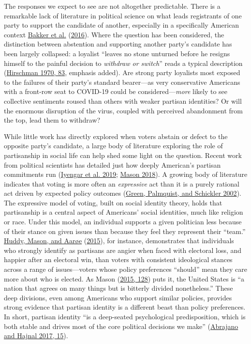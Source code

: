 \documentclass[
  12pt,
]{article}
\begin{document}
The responses we expect to see are not altogether predictable. There is a remarkable lack of literature in political science on what leads registrants of one party to support the candidate of another, especially in a specifically American context \protect\hyperlink{ref-Bakker2016}{Bakker et al.} (\protect\hyperlink{ref-Bakker2016}{2016}). Where the question has been considered, the distinction between abstention and supporting another party's candidate has been largely collapsed: a loyalist ``leaves no stone unturned before he resigns himself to the painful decision to \emph{withdraw or switch}'' reads a typical description (\protect\hyperlink{ref-Hirschman1970a}{Hirschman 1970, 83}, emphasis added). Are strong party loyalists most exposed to the failures of their party's standard bearer---as very conservative Americans with a front-row seat to COVID-19 could be considered---\emph{more} likely to see collective sentiments roused than others with weaker partisan identities? Or will the enormous disruption of the virus, coupled with perceived abandonment from the top, lead them to withdraw?

While little work has directly explored when voters abstain or defect to the opposite party's candidate, a large body of literature exploring the role of partisanship in social life can help shed some light on the question. Recent work from political scientists has detailed just how deeply American's partisan commitments run (\protect\hyperlink{ref-Iyengar2019}{Iyengar et al. 2019}; \protect\hyperlink{ref-Mason2018}{Mason 2018}). A growing body of literature indicates that voting is more often an \emph{expressive} act than it is a purely rational act driven by expected policy outcomes (\protect\hyperlink{ref-Green2002}{Green, Palmquist, and Schickler 2002}). The expressive model of voting, built on social identity theory, holds that partisanship is a central aspect of Americans' social identities, much like religion or race. Under this model, an individual supports a given politician less because of their stance on given issues than because they feel they represent their ``team.'' \protect\hyperlink{ref-Huddy2015}{Huddy, Mason, and Aarøe} (\protect\hyperlink{ref-Huddy2015}{2015}), for instance, demonstrates that individuals who strongly identify as partisans are angier when faced with electoral loss, and happier after an electoral win, than voters with consistent ideological stances across a range of issues---voters whose policy preferences ``should'' mean they care more about who is elected. As Mason (\protect\hyperlink{ref-Mason2015}{2015, 128}) puts it, the United States is ``a nation that agrees on many things but is bitterly divided nonetheless.'' These deep divisions, even among Americans who support similar policies, provides strong evidence that partisan identity is a different beast than policy preferences. In short, partisan identity ``is a deep-seated psychological predisposition, which is both stable and drives most of the core political decisions we make'' (\protect\hyperlink{ref-Abrajano2017}{Abrajano and Hajnal 2017, 15}).
\end{document}
